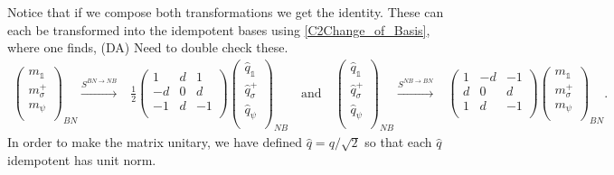 \documentclass[12pt,a4paper]{article}
\newcounter{arrow}
\newcommand{\unit}{\mathds{1}}
\newcommand{\dave}[1]{{\color{ao(english)}\footnotesize{(DA) #1}}}
\begin{document}
Notice that if we compose both transformations we get the identity. 
These can each be transformed into the idempotent bases using \eqref{C2Change_of_Basis}, 
where one finds,
\dave{Need to double check these.}
\begin{align}
\left( \begin{matrix}
m_\unit\\
m_\sigma^+\\
m_\psi\\
\end{matrix} \right)_{BN} 
\xrightarrow{S^{BN \rightarrow NB}} &\frac{1}{2} \left( \begin{matrix}
1&d&1\\
-d&0&d\\
-1&d&-1\\
\end{matrix} \right)
\left( \begin{matrix}
\hat{q}_\unit\\
\hat{q}_\sigma^+\\
\hat{q}_\psi\\
\end{matrix} \right)_{NB}
\quad \text{and} \quad 
\left( \begin{matrix}
\hat{q}_\unit\\
\hat{q}_\sigma^+\\
\hat{q}_\psi\\
\end{matrix} \right)_{NB} 
\xrightarrow{S^{NB \rightarrow BN}} & \left( \begin{matrix}
1&-d&-1\\
d&0&d\\
1&d&-1\\
\end{matrix} \right)
\left( \begin{matrix}
m_\unit\\
m_\sigma^+\\
m_\psi\\
\end{matrix} \right)_{BN}.
\end{align}
In order to make the matrix unitary, we have defined $\hat{q} = q/\sqrt{2}$ so that each $\hat{q}$ idempotent has unit norm.
\end{document}

